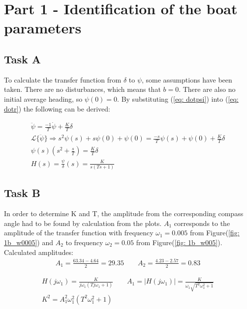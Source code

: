 \section{Part 1 - Identification of the boat parameters}

\subsection{Task A}

To calculate the transfer function from $\delta$ to $\psi$, some assumptions have been taken. There are no disturbances, which means that $b = 0$. There are also no initial average heading, so $\psi(0) = 0$. \newline
By substituting (\ref{eq: dotpsi}) into (\ref{eq: dotr}) the following can be derived:


\begin{align}
    \ddot{\psi} = \frac{-1}{T}\dot{\psi}+\frac{K}{T}\delta  \nonumber    \\
    \mathcal{L}\{\ddot{\psi}\} \Rightarrow s^2\psi(s)+s\psi(0)+\psi(0) = \frac{-s}{T}\psi(s)+\psi(0)+\frac{K}{T}\delta   \nonumber   \\
    \psi(s)(s^2+\frac{s}{T}) = \frac{K}{T}\delta    \nonumber   \\
    H(s) = \frac{\psi}{\delta}(s) = \frac{K}{s(Ts+1)}
\end{align}


\subsection{Task B}
In order to determine K and T, the amplitude from the corresponding compass angle had to be found by calculation from the plots.
$A_1$ corresponds to the amplitude of the transfer function with frequency $\omega_1 = 0.005$ from Figure(\ref{fig: 1b_w0005}) and $A_2$ to frequency $\omega_2 = 0.05$ from Figure(\ref{fig: 1b_w005}).
\\
Calculated amplitudes:
\begin{equation}
    \begin{align}
        A_1 = \frac{63.34 - 4.64}{2} = 29.35 \quad \quad
        A_2 = \frac{4.23 - 2.57}{2} = 0.83 \nonumber
    \end{align}
\end{equation}

\begin{equations}
    \begin{align}
        H(j\omega_1) = \frac{K}{j\omega_1(Tj\omega_1 + 1)} \qquad A_1 = |H(j\omega_1)| = \frac{K}{\omega_1\sqrt{T^2\omega_1^2 + 1}} \nonumber \\
        K^2 = A_1^2\omega_1^2(T^2\omega_1^2 + 1) \label{eq: K_2_1}
    \end{align}
\end{equations}

